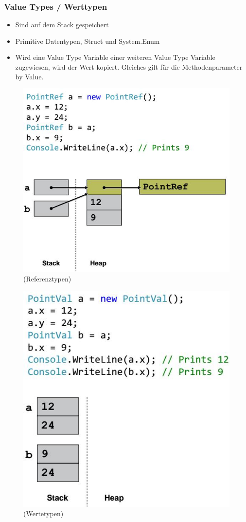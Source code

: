\documentclass[
a4paper,
oneside,
10pt,
fleqn,
headsepline,
toc=listofnumbered, 
bibliography=totocnumbered]{scrartcl}
\begin{document}
\subsubsection{Value Types / Werttypen}
\begin{itemize}
	\item Sind auf dem Stack gespeichert
	\item Primitive Datentypen, Struct und System.Enum
	\item Wird eine Value Type Variable einer weiteren Value Type Variable zugewiesen, wird der Wert kopiert. Gleiches gilt für die Methodenparameter by Value.
\end{itemize}

\begin{figure}[ht!]
	\centering
	\begin{minipage}[t]{0.4\textwidth}
		\centering
		\includegraphics[width=0.8\linewidth]{images/reference_types}
		(Referenztypen)
		\label{fig:searchtreeinsert1}
	\end{minipage}
	\begin{minipage}[t]{0.4\textwidth}
		\centering
		\includegraphics[width=0.8\linewidth]{images/value_types}
		(Wertetypen)
		\label{fig:searchtreeinsert2}
	\end{minipage}
\end{figure}
\end{document}

